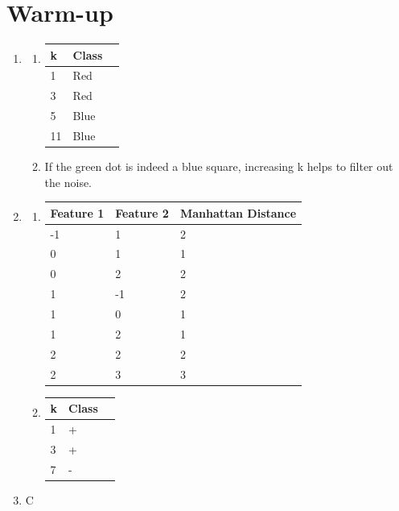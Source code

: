 \documentclass{report}
\begin{document}
\section*{Warm-up}

\begin{enumerate}
  \item   
  	
  	\begin{enumerate}
  	  \item
  	    \begin{center}
          \begin{tabular}{| l | l | l |}
            \hline
            k & Class \\ \hline
            1 & Red\\
            3 & Red\\
            5 & Blue\\
			11 & Blue\\            
            \hline
          \end{tabular}
        \end{center} 
        
        \item If the green dot is indeed a blue square, increasing k helps to filter out the noise.
  	  \end{enumerate} 
  
  \item 
  	\begin{enumerate}
  	  \item
        \begin{center}
          \begin{tabular}{| l | l | l |}
            \hline
            Feature 1 & Feature 2 & Manhattan Distance \\ \hline
            -1 & 1 & 2 \\
            0 & 1 & 1 \\
            0 & 2 & 2 \\
            1 & -1 & 2 \\
            1 & 0 & 1 \\
            1 & 2 & 1 \\
            2 & 2 & 2 \\
            2 & 3 & 3 \\
            \hline
        \end{tabular}
      \end{center}
    
    \item 
      \begin{center}
        \begin{tabular}{| l | l | l |}
          \hline
          k & Class \\ \hline
          1 & + \\
          3 & + \\
          7 & - \\
          \hline
        \end{tabular}
      \end{center}       	  
  	\end{enumerate}

  \item C
\end{enumerate}
\end{document}
